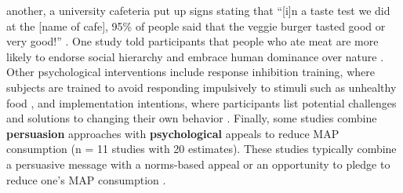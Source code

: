 \documentclass[sn-nature,referee,lineno,pdflatex]{sn-jnl}
\begin{document}
another, a university cafeteria put up signs stating that ``{[}i{]}n a
taste test we did at the {[}name of cafe{]}, 95\% of people said that
the veggie burger tasted good or very good!'' \citep{piester2020}. One
study told participants that people who ate meat are more likely to
endorse social hierarchy and embrace human dominance over nature
\citep{allen2002}. Other psychological interventions include response
inhibition training, where subjects are trained to avoid responding
impulsively to stimuli such as unhealthy food \citep{camp2019}, and
implementation intentions, where participants list potential challenges
and solutions to changing their own behavior
\citep{aberman2018, shreedhar2021}. Finally, some studies combine
\textbf{persuasion} approaches with \textbf{psychological} appeals to
reduce MAP consumption
\citep{aberman2018, berndsen2005, bertolaso2015, carfora2023, fehrenbach2015, hennessy2016, mathur2021effectiveness, mattson2020, piester2020, shreedhar2021}
(n = 11 studies with 20 estimates). These studies typically combine a
persuasive message with a norms-based appeal
\citep{piester2020, mattson2020} or an opportunity to pledge to reduce
one's MAP consumption \citep{mathur2021effectiveness, shreedhar2021}.
\end{document}
